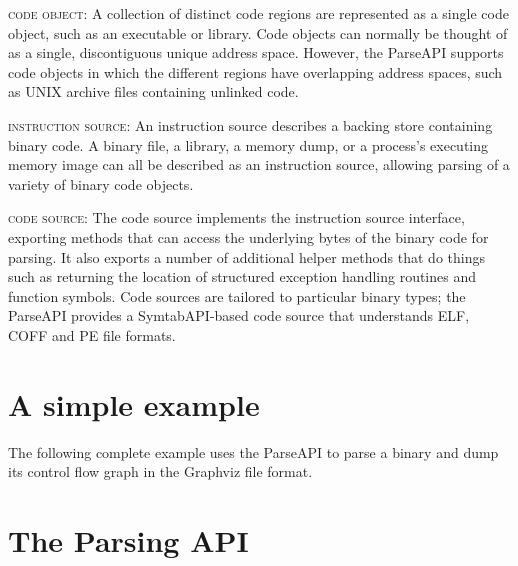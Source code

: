 \documentclass{article}
\begin{document}
%
\begin{itemize}[leftmargin=0pt,label=$\circ$]

{\item {\scshape code object}: A collection of distinct code regions are represented as a single code object, such as an executable or library. Code objects can normally be thought of as a single, discontiguous unique address space. However, the ParseAPI supports code objects in which the different regions have overlapping address spaces, such as UNIX archive files containing unlinked code.
}%

{\item {\scshape instruction source}: An instruction source describes a backing store containing binary code. A binary file, a library, a memory dump, or a process's executing memory image can all be described as an instruction source, allowing parsing of a variety of binary code objects.
}%

{\item {\scshape code source}: The code source implements the instruction source interface, exporting methods that can access the underlying bytes of the binary code for parsing. It also exports a number of additional helper methods that do things such as returning the location of structured exception handling routines and function symbols. Code sources are tailored to particular binary types; the ParseAPI provides a SymtabAPI-based code source that understands ELF, COFF and PE file formats.
}%

\end{itemize}

\section{A simple example}
\label{sec:example}

The following complete example uses the ParseAPI to parse a binary and dump its control flow graph in the Graphviz file format.

\lstset{numbers=left, numberstyle=\tiny, stepnumber=5, numbersep=5pt}
\lstset{showstringspaces=false}


\section{The Parsing API}
\label{sec:api}
\end{document}
